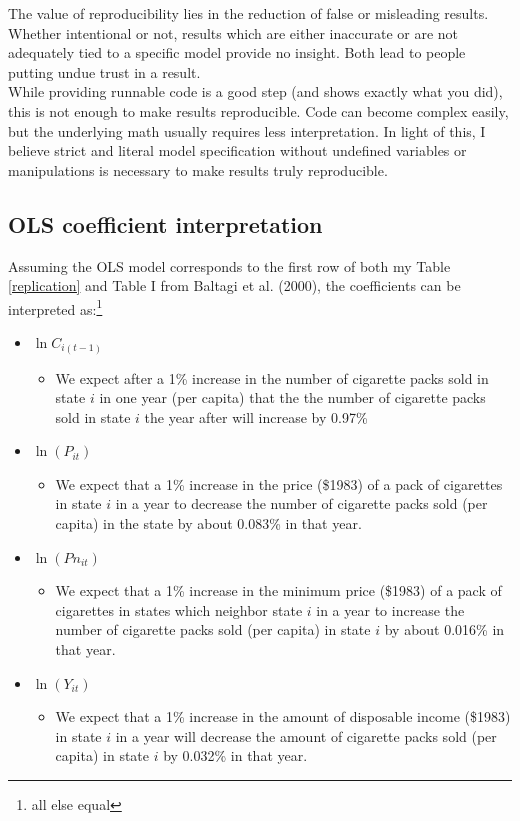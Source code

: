 \documentclass{article}
\begin{document}
The value of reproducibility lies in the reduction of false or misleading results. Whether intentional or not, results which are either inaccurate or are not adequately tied to a specific model provide no insight. Both lead to people putting undue trust in a result.\\

While providing runnable code is a good step (and shows exactly what you did), this is not enough to make results reproducible. Code can become complex easily, but the underlying math usually requires less interpretation. In light of this, I believe strict and literal model specification without undefined variables or manipulations is necessary to make results truly reproducible.

\subsection{OLS coefficient interpretation} 
Assuming the OLS model corresponds to the first row of both my Table \ref{replication} and Table I from Baltagi et al. (2000), the coefficients can be interpreted as:\footnote{all else equal}
\begin{itemize}
\item  $\ln C_{i(t-1)}$
\begin{itemize}
\item We expect after a 1\% increase in the number of cigarette packs sold in state $i$ in one year (per capita) that the the number of cigarette packs sold in state $i$ the year after will increase by 0.97\%
\end{itemize}
\item  $\ln(P_{it})$ 
\begin{itemize}
\item We expect that a 1\% increase in the price (\$1983) of a pack of cigarettes in state $i$ in a year to decrease the number of cigarette packs sold (per capita) in the state by about 0.083\% in that year.
\end{itemize}
\item  $\ln(Pn_{it})$
\begin{itemize}
\item We expect that a 1\% increase in the minimum price (\$1983) of a pack of cigarettes in states which neighbor state $i$ in a year to increase the number of cigarette packs sold (per capita) in state $i$ by about 0.016\% in that year.
\end{itemize}
\item  $\ln(Y_{it})$
\begin{itemize}
\item We expect that a 1\% increase in the amount of disposable income (\$1983) in state $i$ in a year will decrease the amount of cigarette packs sold (per capita) in state $i$ by 0.032\% in that year.
\end{itemize}
\end{itemize}
\end{document}
